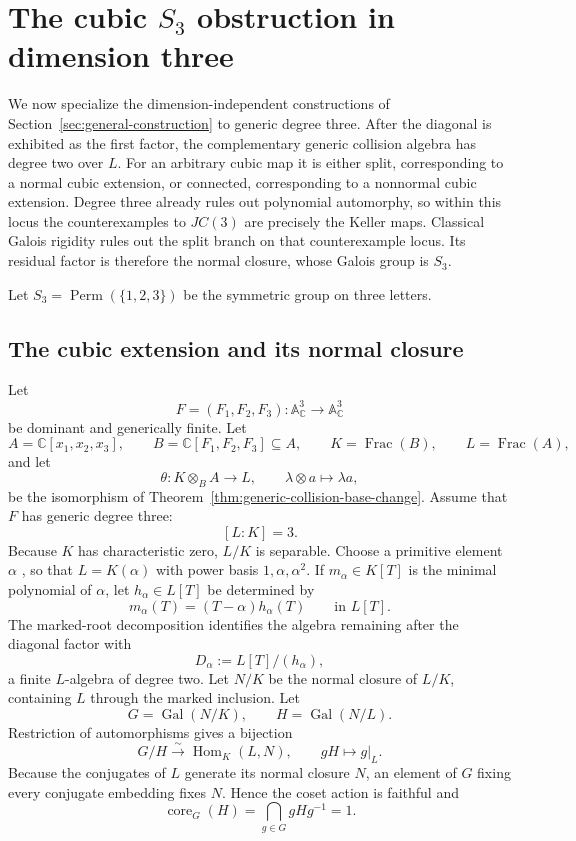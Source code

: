 \documentclass[11pt]{article}
\theoremstyle{remark}
\theoremstyle{definition}
\DeclareMathOperator{\Frac}{Frac}
\DeclareMathOperator{\Gal}{Gal}
\DeclareMathOperator{\Hom}{Hom}
\DeclareMathOperator{\core}{core}
\newcommand{\A}{\mathbb A}
\newcommand{\C}{\mathbb C}
\begin{document}

\section{\texorpdfstring{The cubic \(S_3\) obstruction in dimension three}
  {The cubic S3 obstruction in dimension three}}
\label{sec:cubic-s3-obstruction}

We now specialize the dimension-independent constructions of
Section~\ref{sec:general-construction} to generic degree three.  After the
diagonal is exhibited as the first factor, the complementary
generic collision algebra has degree two over \(L\).  For an
arbitrary cubic map it is either split,
corresponding to a normal cubic extension, or connected, corresponding to
a nonnormal cubic extension.  Degree three already rules out polynomial
automorphy, so within this locus the counterexamples to \(JC(3)\) are
precisely the Keller maps.  Classical Galois rigidity rules out the split
branch on that counterexample locus.  Its residual factor is therefore the
normal closure, whose Galois group is \(S_3\).

Let \(S_3=\operatorname{Perm}(\{1,2,3\})\) be the symmetric group on
three letters.

\subsection{The cubic extension and its normal closure}
\label{sec:cubic-extension}

Let
\[
  F=(F_1,F_2,F_3)\colon\A^3_{\C}\longrightarrow\A^3_{\C}
\]
be dominant and generically finite.  Let
\[
  A=\C[x_1,x_2,x_3],
  \qquad
  B=\C[F_1,F_2,F_3]\subseteq A,
  \qquad
  K=\Frac(B),
  \qquad
  L=\Frac(A),
\]
and let
\[
  \theta\colon K\otimes_BA\longrightarrow L,
  \qquad
  \lambda\otimes a\longmapsto\lambda a,
\]
be the isomorphism of
Theorem~\ref{thm:generic-collision-base-change}.  Assume that \(F\) has
generic degree three:
\[
  [L:K]=3.
\]
Because \(K\) has characteristic zero, \(L/K\) is separable.  Choose a
primitive element \(\alpha\) \cite{StacksPrimitiveElement}, so that
\(L=K(\alpha)\) with power basis
\(1,\alpha,\alpha^2\).
If \(m_\alpha\in K[T]\) is the minimal polynomial of \(\alpha\), let
\(h_\alpha\in L[T]\) be determined by
\[
  m_\alpha(T)=(T-\alpha)h_\alpha(T)
  \qquad\text{in }L[T].
\]
The marked-root decomposition identifies the algebra remaining after the
diagonal factor with
\[
  D_\alpha:=L[T]/(h_\alpha),
\]
a finite \(L\)-algebra of degree two.
Let \(N/K\) be the normal closure of \(L/K\), containing \(L\) through
the marked inclusion.  Let
\[
  G=\Gal(N/K),
  \qquad
  H=\Gal(N/L).
\]
Restriction of automorphisms gives a bijection
\[
  G/H\xrightarrow{\sim}\Hom_K(L,N),
  \qquad gH\longmapsto g|_L.
\]
Because the conjugates of \(L\) generate its normal closure \(N\), an
element of \(G\) fixing every conjugate embedding fixes \(N\).  Hence the
coset action is faithful and
\[
  \core_G(H)=\bigcap_{g\in G}gHg^{-1}=1.
\]
\end{document}
